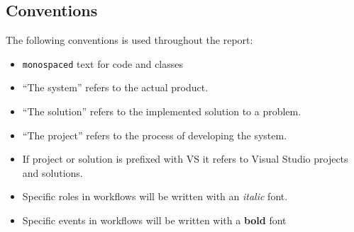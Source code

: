 \subsection{Conventions}
The following conventions is used throughout the report: 
\begin{itemize}
\item \texttt{monospaced} text for code and classes
\item “The system” refers to the actual product.
\item “The solution” refers to the implemented solution to a problem.
\item “The project” refers to the process of developing the system.
\item If project or solution is prefixed with VS it refers to Visual Studio projects and solutions.
\item Specific roles in workflows will be written with an \textit{italic} font.
\item Specific events in workflows will be written with a \textbf{bold} font
\end{itemize}